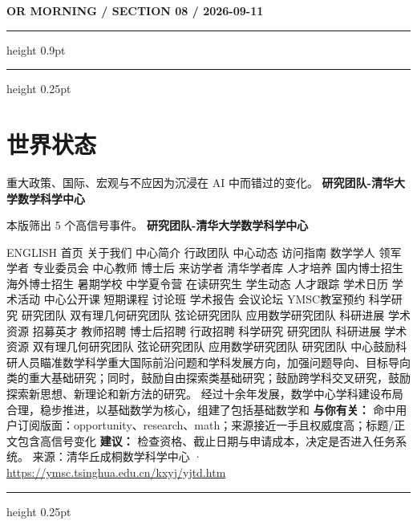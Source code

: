 \documentclass[10.5pt]{ctexart}
\begin{document}
\newpage
{\small\bfseries OR MORNING / SECTION 08 / 2026-09-11}
\vspace{2mm}
\hrule height 0.9pt
\vspace{1.5mm}
\hrule height 0.25pt
\vspace{4mm}
\section*{世界状态}
{\color{ormuted} 重大政策、国际、宏观与不应因为沉浸在 AI 中而错过的变化。}
\vspace{2mm}
{\LARGE\bfseries 研究团队-清华大学数学科学中心}\par
\vspace{1mm}
{\color{ormuted} 本版筛出 5 个高信号事件。}
\vspace{3mm}
{\Large\bfseries 研究团队-清华大学数学科学中心}\par
ENGLISH 首页 关于我们 中心简介 行政团队 中心动态 访问指南 数学学人 领军学者 专业委员会 中心教师 博士后 来访学者 清华学者库 人才培养 国内博士招生 海外博士招生 暑期学校 中学夏令营 在读研究生 学生动态 人才跟踪 学术日历 学术活动 中心公开课 短期课程 讨论班 学术报告 会议论坛 YMSC教室预约 科学研究 研究团队 双有理几何研究团队 弦论研究团队 应用数学研究团队 科研进展 学术资源 招募英才 教师招聘 博士后招聘 行政招聘 科学研究 研究团队 科研进展 学术资源 双有理几何研究团队 弦论研究团队 应用数学研究团队 研究团队 中心鼓励科研人员瞄准数学科学重大国际前沿问题和学科发展方向，加强问题导向、目标导向类的重大基础研究；同时，鼓励自由探索类基础研究；鼓励跨学科交叉研究，鼓励探索新思想、新理论和新方法的研究。 经过十余年发展，数学中心学科建设布局合理，稳步推进，以基础数学为核心，组建了包括基础数学和
\textbf{与你有关：} 命中用户订阅版面：opportunity、research、math；来源接近一手且权威度高；标题/正文包含高信号变化
\textbf{建议：} 检查资格、截止日期与申请成本，决定是否进入任务系统。
{\footnotesize\color{ormuted} 来源：清华丘成桐数学科学中心 · \url{https://ymsc.tsinghua.edu.cn/kxyj/yjtd.htm}}
\vspace{4mm}
\hrule height 0.25pt
\vspace{3mm}
\end{document}
